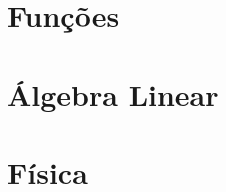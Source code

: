 \documentclass[11pt,fleqn]{book} %
\begin{document}





\part{Funções}						%



%
%
%
\part{Álgebra Linear}						%




%
\part{Física}

%
%
%
%
\end{document}
